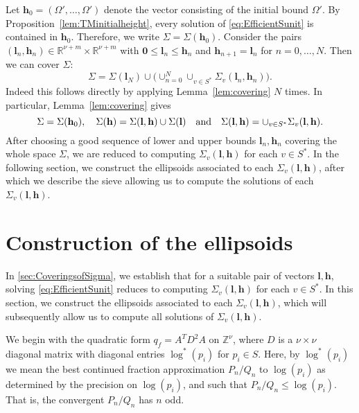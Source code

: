 \documentclass[11pt]{report}
\theoremstyle{definition}
\begin{document}
Let $\mathbf{h}_0 = (\Omega', \dots, \Omega')$ denote the vector consisting of the initial bound $\Omega'$. By Proposition~\ref{lem:TMinitialheight}, every solution of \eqref{eq:EfficientSunit} is contained in $\mathbf{h}_0$. Therefore, we write $\Sigma = \Sigma(\mathbf{h}_0)$. Consider the pairs $(\mathbf{l}_n,\mathbf{h}_n)\in \mathbb{R}^{\nu + m}\times \mathbb{R}^{\nu + m}$ with $\mathbf{0}\leq \mathbf{l}_n\leq \mathbf{h}_n$ and $\mathbf{h}_{n+1}=\mathbf{l}_{n}$ for $n=0,\dotsc,N$. Then we can cover $\Sigma$:
$$\Sigma=\Sigma(\mathbf{l}_{N})\cup\bigl(\cup_{n=0}^{N}\cup_{v\in S^*}\Sigma_v(\mathbf{l}_n,\mathbf{h}_n)\bigl).$$
Indeed this follows directly by applying Lemma~\ref{lem:covering} $N$ times. In particular, Lemma~\ref{lem:covering} gives  $$\Sigma=\Sigma(\mathbf{h}_0), \quad \Sigma(\mathbf{h})=\Sigma(\mathbf{l},\mathbf{h})\cup \Sigma(\mathbf{l}) \quad \textnormal{and} \quad \Sigma(\mathbf{l},\mathbf{h})=\cup_{v\in S^*}\Sigma_v(\mathbf{l},\mathbf{h}).$$
After choosing a good sequence of lower and upper bounds $\mathbf{l}_n,\mathbf{h}_n$ covering the whole space $\Sigma$, we are reduced to computing $\Sigma_v(\mathbf{l},\mathbf{h})$ for each $v \in S^*$. In the following section, we construct the ellipsoids associated to each $\Sigma_v(\mathbf{l},\mathbf{h})$, after which we describe the sieve allowing us to compute the solutions of each $\Sigma_v(\mathbf{l},\mathbf{h})$.


\section{Construction of the ellipsoids}
\label{sec:ConstructionofEllipsoids}

In \autoref{sec:CoveringsofSigma}, we establish that for a suitable pair of vectors $\mathbf{l}, \mathbf{h}$, solving \eqref{eq:EfficientSunit} reduces to computing $\Sigma_v(\mathbf{l},\mathbf{h})$ for each $v \in S^*$. In this section, we construct the ellipsoids associated to each $\Sigma_v(\mathbf{l},\mathbf{h})$, which will subsequently allow us to compute all solutions of $\Sigma_v(\mathbf{l},\mathbf{h})$.

We begin with the quadratic form $q_f=A^TD^2A$ on $\mathbb{Z}^{\nu}$, where $D$ is a $\nu \times \nu$ diagonal matrix with diagonal entries $\log^*(p_i)$ for $p_i \in S$. Here, by $\log^*(p_i)$ we mean the best continued fraction approximation $P_n/Q_n$ to $\log(p_i)$ as determined by the precision on $\log(p_i)$, and such that $P_n/Q_n \leq \log(p_i)$. That is, the convergent $P_n/Q_n$ has $n$ odd.
\end{document}
